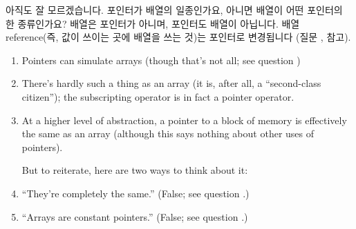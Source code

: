 \begin{faq}
	아직도 잘 모르겠습니다. 포인터가 배열의 일종인가요, 아니면 배열이
	어떤 포인터의 한 종류인가요?
\A
	배열은 포인터가 아니며, 포인터도 배열이 아닙니다.
	배열 reference(즉, 값이 쓰이는 곳에 배열을 쓰는 것)는 포인터로
	변경됩니다 (질문 ,  참고).
\begin{enumerate}
  \item Pointers can simulate arrays (though that's not all; see question )
  \item There's hardly such a thing as an array (it is, after all, a
    ``second-class citizen''); the subscripting operator \TT{[]} is in fact a
    pointer operator.
  \item At a higher level of abstraction, a pointer to a block of memory
    is effectively the same as an array (although this says nothing about other
    uses of pointers).
    
    But to reiterate, here are two ways  to think about it:
  \item ``They're completely the same.'' (False; see question .)
  \item ``Arrays are constant pointers.'' (False; see question .)
\end{enumerate}

\end{faq}

